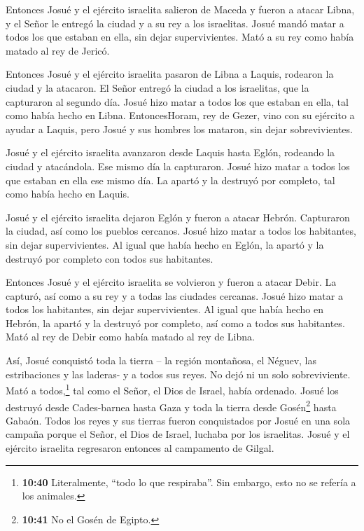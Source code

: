  Entonces Josué y el ejército israelita salieron de Maceda
y fueron a atacar Libna,  y el Señor le entregó la ciudad y
a su rey a los israelitas. Josué mandó matar a todos los que estaban en
ella, sin dejar supervivientes. Mató a su rey como había matado al rey
de Jericó.

 Entonces Josué y el ejército israelita pasaron de Libna a
Laquis, rodearon la ciudad y la atacaron.  El Señor entregó
la ciudad a los israelitas, que la capturaron al segundo día. Josué hizo
matar a todos los que estaban en ella, tal como había hecho en Libna.
 EntoncesHoram, rey de Gezer, vino con su ejército a ayudar
a Laquis, pero Josué y sus hombres los mataron, sin dejar
sobrevivientes.

 Josué y el ejército israelita avanzaron desde Laquis hasta
Eglón, rodeando la ciudad y atacándola.  Ese mismo día la
capturaron. Josué hizo matar a todos los que estaban en ella ese mismo
día. La apartó y la destruyó por completo, tal como había hecho en
Laquis.

 Josué y el ejército israelita dejaron Eglón y fueron a
atacar Hebrón.  Capturaron la ciudad, así como los pueblos
cercanos. Josué hizo matar a todos los habitantes, sin dejar
supervivientes. Al igual que había hecho en Eglón, la apartó y la
destruyó por completo con todos sus habitantes.

 Entonces Josué y el ejército israelita se volvieron y
fueron a atacar Debir.  La capturó, así como a su rey y a
todas las ciudades cercanas. Josué hizo matar a todos los habitantes,
sin dejar supervivientes. Al igual que había hecho en Hebrón, la apartó
y la destruyó por completo, así como a todos sus habitantes. Mató al rey
de Debir como había matado al rey de Libna.

 Así, Josué conquistó toda la tierra -- la región
montañosa, el Néguev, las estribaciones y las laderas- y a todos sus
reyes. No dejó ni un solo sobreviviente. Mató a todos,\footnote{\textbf{10:40}
  Literalmente, ``todo lo que respiraba''. Sin embargo, esto no se
  refería a los animales.} tal como el Señor, el Dios de Israel, había
ordenado.  Josué los destruyó desde Cades-barnea hasta Gaza
y toda la tierra desde Gosén\footnote{\textbf{10:41} No el Gosén de
  Egipto.} hasta Gabaón.  Todos los reyes y sus tierras
fueron conquistados por Josué en una sola campaña porque el Señor, el
Dios de Israel, luchaba por los israelitas.  Josué y el
ejército israelita regresaron entonces al campamento de Gilgal.

